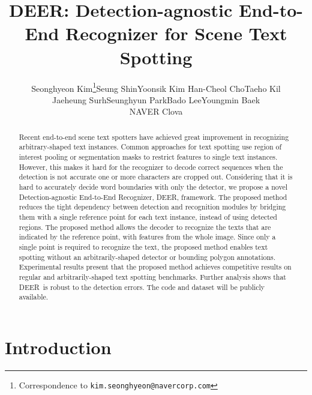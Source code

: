 \documentclass[10pt,twocolumn,letterpaper]{article}
\newcommand{\methodname}[0]{DEER}
\begin{document}
\title{DEER: Detection-agnostic End-to-End Recognizer for Scene Text Spotting}

\author{Seonghyeon Kim\thanks{Correspondence to \texttt{kim.seonghyeon@navercorp.com}}\quad Seung Shin\quad Yoonsik Kim \quad Han-Cheol Cho\quad Taeho Kil \\ \quad Jaeheung Surh\quad Seunghyun Park\quad Bado Lee\quad Youngmin Baek \\
\vspace{1.3ex}
NAVER Clova }
\maketitle

\begin{abstract}


Recent end-to-end scene text spotters have achieved great improvement in recognizing arbitrary-shaped text instances. Common approaches for text spotting use region of interest pooling or segmentation masks to restrict features to single text instances. However, this makes it hard for the recognizer to decode correct sequences when the detection is not accurate \ie one or more characters are cropped out. Considering that it is hard to accurately decide word boundaries with only the detector, we propose a novel Detection-agnostic End-to-End Recognizer, \methodname, framework. The proposed method reduces the tight dependency between detection and recognition modules by bridging them with a single reference point for each text instance, instead of using detected regions. The proposed method allows the decoder to recognize the texts that are indicated by the reference point, with features from the whole image. Since only a single point is required to recognize the text, the proposed method enables text spotting without an arbitrarily-shaped detector or bounding polygon annotations. Experimental results present that the proposed method achieves competitive results on regular and arbitrarily-shaped text spotting benchmarks. Further analysis shows that \methodname~is robust to the detection errors. The code and dataset will be publicly available.






%
 \end{abstract}

\section{Introduction}
\end{document}
